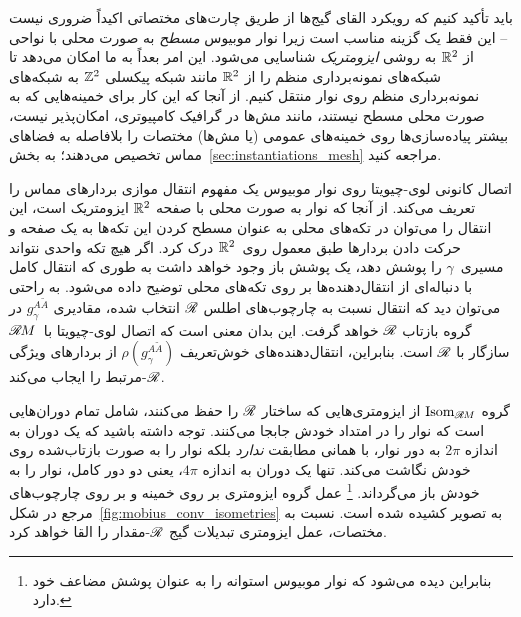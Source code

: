 باید تأکید کنیم که رویکرد القای گیج‌ها از طریق چارت‌های مختصاتی اکیداً ضروری نیست
-- این فقط یک گزینه مناسب است زیرا نوار موبیوس \emph{مسطح} به صورت محلی با نواحی از $\mathbb{R}^2$ به روشی \emph{ایزومتریک} شناسایی می‌شود.
این امر بعداً به ما امکان می‌دهد تا شبکه‌های نمونه‌برداری منظم را از $\mathbb{R}^2$ مانند شبکه پیکسلی $\mathbb{Z}^2$ به شبکه‌های نمونه‌برداری منظم روی نوار منتقل کنیم.
از آنجا که این کار برای خمینه‌هایی که به صورت محلی مسطح نیستند، مانند مش‌ها در گرافیک کامپیوتری، امکان‌پذیر نیست، بیشتر پیاده‌سازی‌ها روی خمینه‌های عمومی (یا مش‌ها) مختصات را بلافاصله به فضاهای مماس تخصیص می‌دهند؛ به بخش~\ref{sec:instantiations_mesh} مراجعه کنید.


اتصال کانونی لوی-چیویتا روی نوار موبیوس یک مفهوم انتقال موازی بردارهای مماس را تعریف می‌کند.
از آنجا که نوار به صورت محلی با صفحه $\mathbb{R}^2$ ایزومتریک است، این انتقال را می‌توان در تکه‌های محلی به عنوان مسطح کردن این تکه‌ها به یک صفحه و حرکت دادن بردارها طبق معمول روی~$\mathbb{R}^2$ درک کرد.
اگر هیچ تکه واحدی نتواند مسیری~$\gamma$ را پوشش دهد، یک پوشش باز وجود خواهد داشت به طوری که انتقال کامل با دنباله‌ای از انتقال‌دهنده‌ها بر روی تکه‌های محلی توضیح داده می‌شود.
به راحتی می‌توان دید که انتقال نسبت به چارچوب‌های اطلس $\mathscr{R}$ انتخاب شده، مقادیری $g_\gamma^{A\widetilde{A}}$ در گروه بازتاب $\mathscr{R}$ خواهد گرفت.
این بدان معنی است که اتصال لوی-چیویتا با~$\mathscr{R}\mkern-1.8muM$ سازگار با $\mathscr{R}$ است.
بنابراین، انتقال‌دهنده‌های خوش‌تعریف $\rho( g_\gamma^{A\widetilde{A}} )$ از بردارهای ویژگی $\mathscr{R}$-مرتبط را ایجاب می‌کند.


گروه $\operatorname{Isom}_{\mathscr{R}\mkern-1.8muM}$ از ایزومتری‌هایی که ساختار $\mathscr{R}$ را حفظ می‌کنند، شامل تمام دوران‌هایی است که نوار را در امتداد خودش جابجا می‌کنند.
توجه داشته باشید که یک دوران به اندازه $2\pi$ به دور نوار، با همانی مطابقت \emph{ندارد} بلکه نوار را به صورت بازتاب‌شده روی خودش نگاشت می‌کند.
تنها یک دوران به اندازه $4\pi$، یعنی دو دور کامل، نوار را به خودش باز می‌گرداند.%
\footnote{
	بنابراین دیده می‌شود که نوار موبیوس استوانه را به عنوان پوشش مضاعف خود دارد.
}
عمل گروه ایزومتری بر روی خمینه و بر روی چارچوب‌های مرجع در شکل~\ref{fig:mobius_conv_isometries} به تصویر کشیده شده است.
نسبت به مختصات، عمل ایزومتری تبدیلات گیج $\mathscr{R}$-مقدار را القا خواهد کرد.


